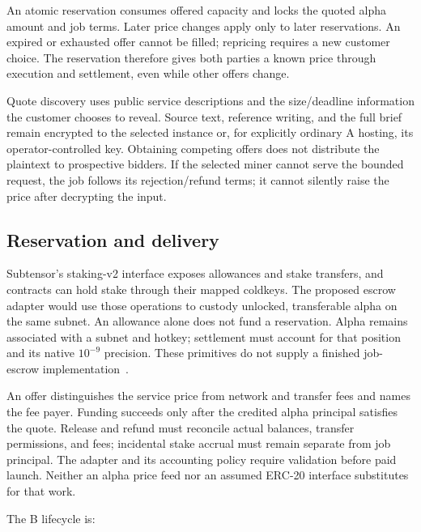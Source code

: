 An atomic reservation consumes offered capacity and locks the quoted
alpha amount and job terms. Later price changes apply only to later
reservations. An expired or exhausted offer cannot be filled; repricing
requires a new customer choice. The reservation therefore gives both
parties a known price through execution and settlement, even while
other offers change.

Quote discovery uses public service descriptions and the size/deadline
information the customer chooses to reveal. Source text, reference
writing, and the full brief remain encrypted to the selected instance
or, for explicitly ordinary A hosting, its operator-controlled key.
Obtaining competing offers does not distribute the plaintext to
prospective bidders. If the selected miner cannot serve the bounded
request, the job follows its rejection/refund terms; it cannot silently
raise the price after decrypting the input.

\subsection{Reservation and delivery}\label{reservation-and-delivery}

Subtensor's staking-v2 interface exposes allowances and stake transfers,
and contracts can hold stake through their mapped coldkeys. The proposed
escrow adapter would use those operations to custody unlocked,
transferable alpha on the same subnet. An allowance alone does not fund
a reservation. Alpha remains associated with a subnet and hotkey;
settlement must account for that position and its native \(10^{-9}\)
precision. These primitives do not supply a finished job-escrow
implementation~\cite{stakingv2,evmstake}.

An offer distinguishes the service price from network and transfer fees
and names the fee payer. Funding succeeds only after the credited alpha
principal satisfies the quote. Release and refund must reconcile actual
balances, transfer permissions, and fees; incidental stake accrual must
remain separate from job principal. The adapter and its accounting
policy require validation before paid launch. Neither an alpha price
feed nor an assumed ERC-20 interface substitutes for that work.

The B lifecycle is:

